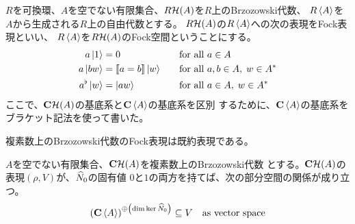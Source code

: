 {	\begin{definition}[Fock空間]\label{def:Fock空間} %
		$R$を可換環、$A$を空でない有限集合、$R{{\mathcal{H}}}(A)$を$R$上のBrzozowski代数、
		$R\mathinner{\langle{A}\rangle}$を$A$から生成される$R$上の自由代数とする。
		$R{{\mathcal{H}}}(A)$の$R\mathinner{\langle{A}\rangle}$への次の表現をFock表現といい、
		$R\mathinner{\langle{A}\rangle}$を$R{{\mathcal{H}}}(A)$のFock空間ということにする。
		\begin{alignat*}{2}
			a\mathinner{|{1}\rangle} &= 0 &\quad&\text{for all } a\in A \\
			a\mathinner{|{bw}\rangle} &= \mathinner{[\![a=b]\!]}\mathinner{|{w}\rangle} 
				&\quad&\text{for all } a,b\in A,\; w\in A^* \\
			a^\flat\mathinner{|{w}\rangle} &= \mathinner{|{aw}\rangle} 
				&\quad&\text{for all } a\in A,\; w\in A^*
		\end{alignat*}
		ここで、$\mathbf{C}{{\mathcal{H}}}(A)$の基底系と$\mathbf{C}\mathinner{\langle{A}\rangle}$の基底系を区別
		するために、$\mathbf{C}\mathinner{\langle{A}\rangle}$の基底系をブラケット記法を使って書いた。
	\end{definition} %

	\begin{proposition}[Fock表現の既約性]\label{prop:Fock表現の既約性} %
		複素数上のBrzozowski代数のFock表現は既約表現である。
	\end{proposition} %

	\begin{proposition}[数演算子による表現の分類]\label{prop:数演算子による表現の分類} %
		$A$を空でない有限集合、$\mathbf{C}{{\mathcal{H}}}(A)$を複素数上のBrzozowski代数
		とする。$\mathbf{C}{{\mathcal{H}}}(A)$の表現$(\rho,V)$が、$\widehat{N}_0$の固有値
		$0$と$1$の両方を持てば、次の部分空間の関係が成り立つ。
		\begin{equation*}\begin{split}
			\mathinner{\left({\ensuremath{\mathbf{C}}\mathinner{\langle{A}\rangle}}\right)}^{\oplus\mathinner{\left({\dim\ker\widehat{N}_0}\right)}} \subseteq V
			\quad\text{as vector space}
		\end{split}\end{equation*}
	\end{proposition} %

}
